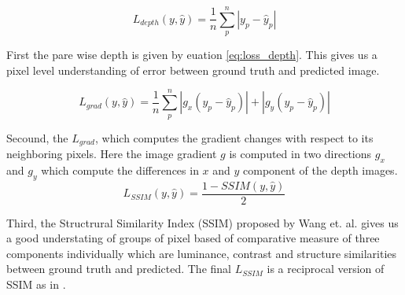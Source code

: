 

\begin{equation} \label{eq:loss_depth}
      L_{depth}(y, \hat{y})= \frac{1}{n} \sum_{p}^{n} \left|y_{p} - \hat{y}_{p} \right|
\end{equation}

First the pare wise depth is given by euation \ref{eq:loss_depth}. This gives us a pixel level understanding of error between ground truth and predicted image.  

\begin{equation} \label{eq:loss_grad}
       L_{grad}(y, \hat{y}) =  \frac{1}{n} \sum_{p}^{n} \left| g_{x} (y_{p} - \hat{y}_{p}) \right| + \left| g_{y} (y_{p} - \hat{y}_{p}) \right|
\end{equation}


Secound, the \(L_{grad}\), which computes the gradient changes with respect to its neighboring pixels. Here the image gradient \(g\) is computed in two directions \(g_{x}\) and \(g_{y}\) which compute the differences in \(x\) and \(y\) component of the depth images. \\


\begin{equation} \label{eq:loss_SSIM}
       L_{SSIM}(y, \hat{y}) = \frac{1- SSIM(y, \hat{y})}{2}
\end{equation}

Third, the Structrural Similarity Index (SSIM) proposed by Wang et. al. \cite{wang2004image} gives us a good understating of groups of pixel based of comparative measure of three components individually which are luminance, contrast and structure similarities between ground truth and predicted. The final \(L_{SSIM}\) is a reciprocal version of SSIM as in \cite{Alhashim2018,  ummenhofer2017demon, huang2018deepmvs}.





